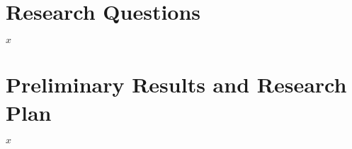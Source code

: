 \documentclass[11pt]{beamer}
\begin{document}
\section{Research Questions}
\begin{frame}

$x$

\end{frame}




\section{Preliminary Results and Research Plan}
\begin{frame}

$x$

\end{frame}




\end{document}
